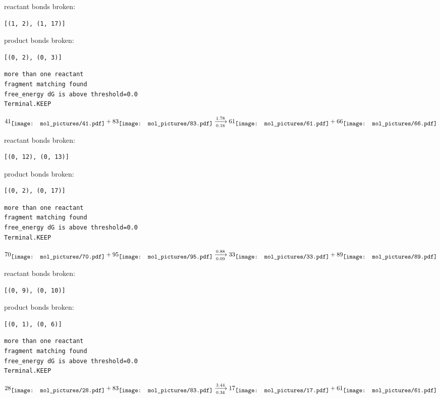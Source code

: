 \documentclass{article}
\begin{document}
reactant bonds broken:\begin{verbatim}
[(1, 2), (1, 17)]
\end{verbatim}
product bonds broken:\begin{verbatim}
[(0, 2), (0, 3)]
\end{verbatim}




\vspace{1cm}
\begin{verbatim}
more than one reactant
fragment matching found
free_energy dG is above threshold=0.0
Terminal.KEEP
\end{verbatim}
$$
41
\raisebox{-.5\height}{\texttt{[image: mol\_pictures/41.pdf]}}
+
83
\raisebox{-.5\height}{\texttt{[image: mol\_pictures/83.pdf]}}
\xrightarrow[0.18]{1.78}
61
\raisebox{-.5\height}{\texttt{[image: mol\_pictures/61.pdf]}}
+
66
\raisebox{-.5\height}{\texttt{[image: mol\_pictures/66.pdf]}}
$$


reactant bonds broken:\begin{verbatim}
[(0, 12), (0, 13)]
\end{verbatim}
product bonds broken:\begin{verbatim}
[(0, 2), (0, 17)]
\end{verbatim}




\vspace{1cm}
\begin{verbatim}
more than one reactant
fragment matching found
free_energy dG is above threshold=0.0
Terminal.KEEP
\end{verbatim}
$$
70
\raisebox{-.5\height}{\texttt{[image: mol\_pictures/70.pdf]}}
+
95
\raisebox{-.5\height}{\texttt{[image: mol\_pictures/95.pdf]}}
\xrightarrow[0.09]{0.88}
33
\raisebox{-.5\height}{\texttt{[image: mol\_pictures/33.pdf]}}
+
89
\raisebox{-.5\height}{\texttt{[image: mol\_pictures/89.pdf]}}
$$


reactant bonds broken:\begin{verbatim}
[(0, 9), (0, 10)]
\end{verbatim}
product bonds broken:\begin{verbatim}
[(0, 1), (0, 6)]
\end{verbatim}




\vspace{1cm}
\begin{verbatim}
more than one reactant
fragment matching found
free_energy dG is above threshold=0.0
Terminal.KEEP
\end{verbatim}
$$
28
\raisebox{-.5\height}{\texttt{[image: mol\_pictures/28.pdf]}}
+
83
\raisebox{-.5\height}{\texttt{[image: mol\_pictures/83.pdf]}}
\xrightarrow[0.34]{3.44}
17
\raisebox{-.5\height}{\texttt{[image: mol\_pictures/17.pdf]}}
+
61
\raisebox{-.5\height}{\texttt{[image: mol\_pictures/61.pdf]}}
$$
\end{document}

